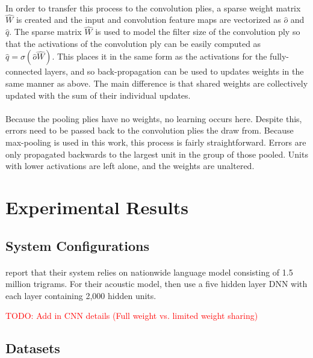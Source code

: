 \documentclass[letterpaper]{article}
\newcommand{\TODO}[1]{\textcolor{red}{TODO: #1}}
\begin{document}
\paragraph{} In order to transfer this process to the convolution plies, a sparse weight matrix $\hat{W}$ is created and the input and convolution feature maps are vectorized as $\hat{o}$ and $\hat{q}$. The sparse matrix $\hat{W}$ is used to model the filter size of the convolution ply so that the activations of the convolution ply can be easily computed as $\hat{q} = \sigma (\hat{o}\hat{W})$. This places it in the same form as the activations for the fully-connected layers, and so back-propagation can be used to updates weights in the same manner as above. The main difference is that shared weights are collectively updated with the sum of their individual updates.

\paragraph{} Because the pooling plies have no weights, no learning occurs here. Despite this, errors need to be passed back to the convolution plies the draw from. Because max-pooling is used in this work, this process is fairly straightforward. Errors are only propagated backwards to the largest unit in the group of those pooled. Units with lower activations are left alone, and the weights are unaltered.

\section*{Experimental Results} 

\subsection*{System Configurations}

\paragraph{} \cite{DBLP:journals/taslp/DahlYDA12} report that their system relies on nationwide language model consisting of 1.5 million trigrams. For their acoustic model, then use a five hidden layer DNN with each layer containing 2,000 hidden units. 

\TODO{Add in CNN details (Full weight vs. limited weight sharing)}

\subsection*{Datasets}
\end{document}

